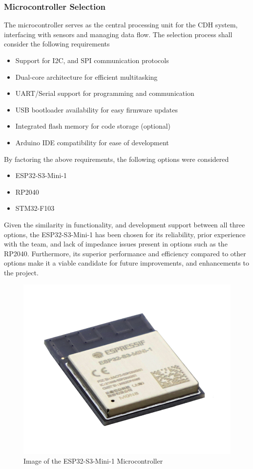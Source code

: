 \documentclass{report}
\begin{document}
                \subsubsection{Microcontroller Selection}
                    The microcontroller serves as the central processing unit for the 
                    CDH system, interfacing with sensors and managing data flow.
                    The selection process shall consider the following requirements
                    \begin{itemize}
                        \item Support for I2C, and SPI communication protocols
                        \item Dual-core architecture for efficient multitasking 
                        \item UART/Serial support for programming and communication
                        \item USB bootloader availability for easy firmware updates
                        \item Integrated flash memory for code storage (optional)
                        \item Arduino IDE compatibility for ease of development
                    \end{itemize}
                    By factoring the above requirements, the following options
                    were considered
                    \begin{itemize}
                        \item ESP32-S3-Mini-1
                        \item RP2040
                        \item STM32-F103
                    \end{itemize}
                    Given the similarity in functionality, and development support between
                    all three options, the ESP32-S3-Mini-1 has been chosen for its reliability, 
                    prior experience with the team, and lack of impedance issues present in 
                    options such as the RP2040. Furthermore, its superior performance and efficiency
                    compared to other options make it a viable candidate for future improvements,
                    and enhancements to the project.
                    \begin{figure}[H]
                        \centering
                        \includegraphics[width=0.2\linewidth]{figures/MC_IMG.png}
                        \caption{Image of the ESP32-S3-Mini-1 Microcontroller}
                        \label{fig:mc_img}
                    \end{figure}
\end{document}

